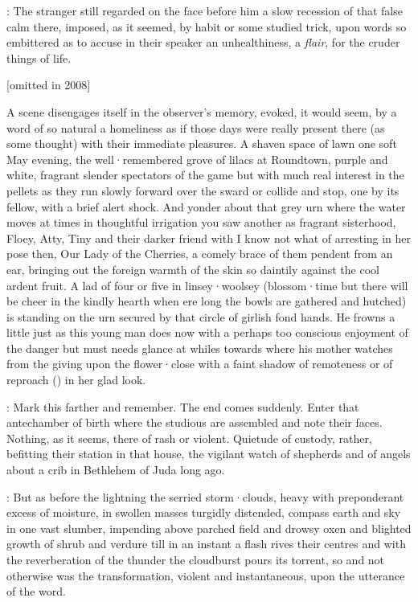 
:
The stranger still regarded on the face before him a slow recession of
that false calm there,
imposed,
as it seemed,
by habit or some studied
trick,
upon words so embittered as to accuse in their speaker an
unhealthiness,
a \emph{flair},
for the cruder things of life.

[omitted in 2008]

A scene disengages itself in the observer's memory,
evoked,
it would seem,
by a word of so natural a homeliness as if those days were really present there
(as some thought)
with their immediate pleasures.
A shaven space of lawn one soft
May evening,
the well·remembered grove of lilacs at Roundtown,
purple and
white,
fragrant slender spectators of the game but with much real
interest in the pellets as they run slowly forward over the sward or
collide and stop,
one by its fellow,
with a brief alert shock.
And yonder
about that grey urn where the water moves at times in thoughtful
irrigation you saw another as fragrant sisterhood,
Floey,
Atty,
Tiny and
their darker friend with I know not what of arresting in her pose then,
Our Lady of the Cherries,
a comely brace of them pendent from an ear,
bringing out the foreign warmth of the skin so daintily against the cool ardent fruit.
A lad of four or five in linsey·woolsey
(blossom·time but there will be cheer in the kindly hearth when ere long the bowls are gathered and hutched)
is standing on the urn secured by that circle of girlish fond hands.
He frowns a little just as this young man does now
with a perhaps too conscious enjoyment of the danger but must needs
glance at whiles towards where his mother watches
from the  giving upon the flower·close
with a faint shadow of remoteness or of reproach
() in her glad look.


:
Mark this farther and remember.
The end comes suddenly.
Enter that antechamber of birth where the studious are assembled
and note their faces.
Nothing,
as it seems,
there of rash or violent.
Quietude of custody,
rather,
befitting their station in that house,
the vigilant watch of shepherds and of angels about a crib in Bethlehem of Juda long ago.

:
But as before the lightning the serried storm·clouds,
heavy with preponderant excess of moisture,
in swollen masses turgidly distended,
compass earth and sky in one vast slumber,
impending above parched field and drowsy oxen and blighted growth of shrub and verdure till in an instant a flash rives their centres and with the reverberation of the thunder the cloudburst pours its torrent,
so and not otherwise was the transformation,
violent and instantaneous,
upon the utterance of the word.


